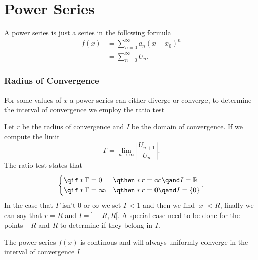 \part{Power Series}

A power series is just a series in the following formula
\begin{align*}
	f(x) & =\sum_{n=0}^{\infty} a_n(x-x_0)^n \\
	     & =\sum_{n=0}^{\infty} U_n
	.\end{align*}

\section{Radius of Convergence}

For some values of $x$ a power series can either diverge or converge, to determine the interval of convergence we employ the ratio test

\begin{theorem}
	Let $r$ be the radius of convergence and $I$ be the domain of convergence. If we compute the limit
	\[
		\Gamma = \lim_{n \to \infty}\left| \frac{U_{n+1}}{U_n} \right|
		.\]
	The ratio test states that
	\[
		\begin{cases}
			\qif* \Gamma = 0      & \qthen* r=\infty\qand I=\mathbb{R} \\
			\qif* \Gamma = \infty & \qthen* r=0\qand I=\{0\}           \\
		\end{cases}
		.\]
	In the case that $\Gamma$ isn't 0 or $\infty$ we set $\Gamma<1$ and then we find $|x|<R$, finally we can say that $r=R$ and $I=]-R,R[$. A special case need to be done for the points  $-R$ and $R$ to determine if they belong in  $I$.
\end{theorem}

\begin{remark}
	The power series $f(x)$ is continous and will always uniformly converge in the interval of convergence $I$
\end{remark}


